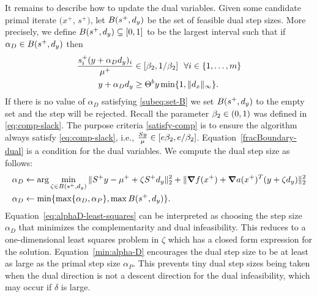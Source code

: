 \documentclass{article}
\begin{document}
It remains to describe how to update the dual variables. Given some candidate primal iterate $(x^{+}$, $s^{+})$,  let $B( s^{+}, d_{y} )$ be the set of feasible dual step sizes. More precisely,  we define $B( s^{+}, d_{y} ) \subseteq [0,1]$ to be the largest interval such that if $\alpha_{D} \in B( s^{+}, d_{y} )$ then
\begin{subequations}\label{subeq:set-B}
\begin{flalign}
 \frac{s^{+}_i (y + \alpha_{D} \dir{y})_i}{\mu^{+}} &\in [\parComp, 1/\parComp ] ~~ \forall i \in \{ 1, \dots, m \} \label{satisfy-comp} \\
y + \alpha_{D} \dir{y} &\ge  \parFracBoundary y \min\{ 1 , \| \dir{x} \|_{\infty} \}. \label{fracBoundary-dual} %
\end{flalign}
\end{subequations}
If there is no value of $\alpha_{D}$ satisfying \eqref{subeq:set-B} we set $B( s^{+}, d_{y} )$ to the empty set and the step will be rejected. Recall the parameter $\beta_{2} \in (0,1)$ was defined in \eqref{eq:comp-slack}. The purpose criteria \eqref{satisfy-comp} is to ensure the algorithm always satisfy \eqref{eq:comp-slack}, i.e., $\frac{S y}{\mu} \in [e \beta_{2}, e/\beta_{2} ]$. Equation~\eqref{fracBoundary-dual} is a \fracBound{} condition for the dual variables.
 We compute the dual step size as follows:
\begin{subequations}\label{eq:compute-alpha-D}
\begin{flalign}
\alpha_{D} &\gets \arg \min_{\zeta \in B( s^{+}, \dir{y} )} \| S^{+} y - \mu^{+} + \zeta S^{+} \dir{y} \|^2_{2} + \| \grad \obj(x^{+})   +  \grad \cons(x^{+})^T (y + \zeta \dir{y}) \|^{2}_{2} %
\label{eq:alphaD-least-squares} \\
 \alpha_{D} &\gets \min\{ \max\{ \alpha_{D}, \alpha_{P} \}, \max B( s^{+}, \dir{y} ) \}. \label{min:alpha-D}
\end{flalign}
\end{subequations}
Equation~\eqref{eq:alphaD-least-squares} can be interpreted as choosing the step size $\alpha_{D}$ that minimizes the complementarity and dual infeasibility. This reduces to a one-dimensional least squares problem in $\zeta$ which has a closed form expression for the solution. Equation~\eqref{min:alpha-D} encourages the dual step size to be at least as large as the primal step size $\alpha_{P}$. This prevents tiny dual step sizes being taken when the dual direction is not a descent direction for the dual infeasibility, which may occur if $\delta$ is large. %
\end{document}
